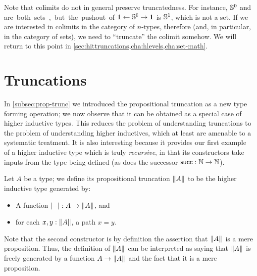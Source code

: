 \begin{rmk}
  Note that colimits do not in general preserve truncatedness.
  For instance, $\mathbb{S}^0$ and \unit are both sets, but the pushout of $\mathbf{1} \leftarrow \mathbb{S}^0 \to \mathbf{1}$ is $\mathbb{S}^1$, which is not a set.
  If we are interested in colimits in the category of $n$-types, therefore (and, in particular, in the category of sets), we need to ``truncate'' the colimit somehow.
  We will return to this point in \cref{sec:hittruncations,cha:hlevels,cha:set-math}.
\end{rmk}


\section{Truncations}
\label{sec:hittruncations}

%
In \cref{subsec:prop-trunc} we introduced the propositional truncation as a new type forming operation;
we now observe that it can be obtained as a special case of higher inductive types.
This reduces the problem of understanding truncations to the problem of understanding higher inductives, which at least are amenable to a systematic treatment.
It is also interesting because it provides our first example of a higher inductive type which is truly \emph{recursive}, in that its constructors take inputs from the type being defined (as does the successor $\mathsf{succ}:\mathbb{N}\to\mathbb{N}$).

Let $A$ be a type; we define its propositional truncation $\mathopen{}\left\Vert A\right\Vert_{}\mathclose{}$ to be the higher inductive type generated by:
\begin{itemize}
\item A function $|\mathord{\hspace{1pt}\text{--}\hspace{1pt}}|_{}^{} : A \to \mathopen{}\left\Vert A\right\Vert_{}\mathclose{}$, and
\item for each $x,y:\mathopen{}\left\Vert A\right\Vert_{}\mathclose{}$, a path $x=y$.
\end{itemize}
Note that the second constructor is by definition the assertion that $\mathopen{}\left\Vert A\right\Vert_{}\mathclose{}$ is a mere proposition.
Thus, the definition of $\mathopen{}\left\Vert A\right\Vert_{}\mathclose{}$ can be interpreted as saying that $\mathopen{}\left\Vert A\right\Vert_{}\mathclose{}$ is freely generated by a function $A\to\mathopen{}\left\Vert A\right\Vert_{}\mathclose{}$ and the fact that it is a mere proposition.

